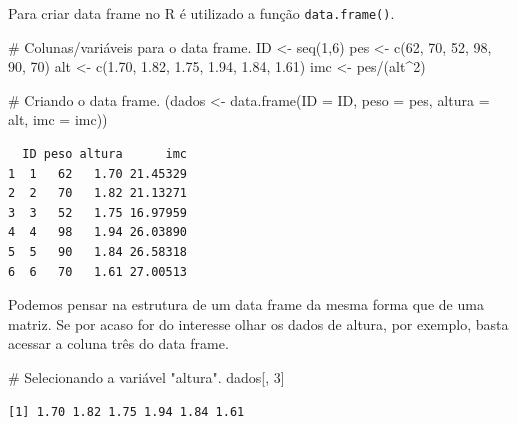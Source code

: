 \documentclass[
  letterpaper,
  DIV=11,
  numbers=noendperiod]{scrreprt}
\newenvironment{Shaded}{\begin{snugshade}}{\end{snugshade}}
\newcommand{\AttributeTok}[1]{\textcolor[rgb]{0.40,0.45,0.13}{#1}}
\newcommand{\CommentTok}[1]{\textcolor[rgb]{0.37,0.37,0.37}{#1}}
\newcommand{\DecValTok}[1]{\textcolor[rgb]{0.68,0.00,0.00}{#1}}
\newcommand{\FloatTok}[1]{\textcolor[rgb]{0.68,0.00,0.00}{#1}}
\newcommand{\FunctionTok}[1]{\textcolor[rgb]{0.28,0.35,0.67}{#1}}
\newcommand{\NormalTok}[1]{\textcolor[rgb]{0.00,0.23,0.31}{#1}}
\newcommand{\OtherTok}[1]{\textcolor[rgb]{0.00,0.23,0.31}{#1}}
\newcommand{\SpecialCharTok}[1]{\textcolor[rgb]{0.37,0.37,0.37}{#1}}
\begin{document}
Para criar data frame no R é utilizado a função \texttt{data.frame()}.

\begin{Shaded}
\begin{Highlighting}[]
\CommentTok{\# Colunas/variáveis para o data frame.}
\NormalTok{ID }\OtherTok{\textless{}{-}} \FunctionTok{seq}\NormalTok{(}\DecValTok{1}\NormalTok{,}\DecValTok{6}\NormalTok{)}
\NormalTok{pes }\OtherTok{\textless{}{-}} \FunctionTok{c}\NormalTok{(}\DecValTok{62}\NormalTok{, }\DecValTok{70}\NormalTok{, }\DecValTok{52}\NormalTok{, }\DecValTok{98}\NormalTok{, }\DecValTok{90}\NormalTok{, }\DecValTok{70}\NormalTok{)}
\NormalTok{alt }\OtherTok{\textless{}{-}} \FunctionTok{c}\NormalTok{(}\FloatTok{1.70}\NormalTok{, }\FloatTok{1.82}\NormalTok{, }\FloatTok{1.75}\NormalTok{, }\FloatTok{1.94}\NormalTok{, }\FloatTok{1.84}\NormalTok{, }\FloatTok{1.61}\NormalTok{)}
\NormalTok{imc }\OtherTok{\textless{}{-}}\NormalTok{ pes}\SpecialCharTok{/}\NormalTok{(alt}\SpecialCharTok{\^{}}\DecValTok{2}\NormalTok{)}

\CommentTok{\# Criando o data frame.}
\NormalTok{(dados }\OtherTok{\textless{}{-}} \FunctionTok{data.frame}\NormalTok{(}\AttributeTok{ID =}\NormalTok{ ID, }\AttributeTok{peso =}\NormalTok{ pes, }\AttributeTok{altura =}\NormalTok{ alt, }\AttributeTok{imc =}\NormalTok{ imc))}
\end{Highlighting}
\end{Shaded}

\begin{verbatim}
  ID peso altura      imc
1  1   62   1.70 21.45329
2  2   70   1.82 21.13271
3  3   52   1.75 16.97959
4  4   98   1.94 26.03890
5  5   90   1.84 26.58318
6  6   70   1.61 27.00513
\end{verbatim}

Podemos pensar na estrutura de um data frame da mesma forma que de uma
matriz. Se por acaso for do interesse olhar os dados de altura, por
exemplo, basta acessar a coluna três do data frame.

\begin{Shaded}
\begin{Highlighting}[]
\CommentTok{\# Selecionando a variável "altura".}
\NormalTok{dados[, }\DecValTok{3}\NormalTok{]}
\end{Highlighting}
\end{Shaded}

\begin{verbatim}
[1] 1.70 1.82 1.75 1.94 1.84 1.61
\end{verbatim}
\end{document}

